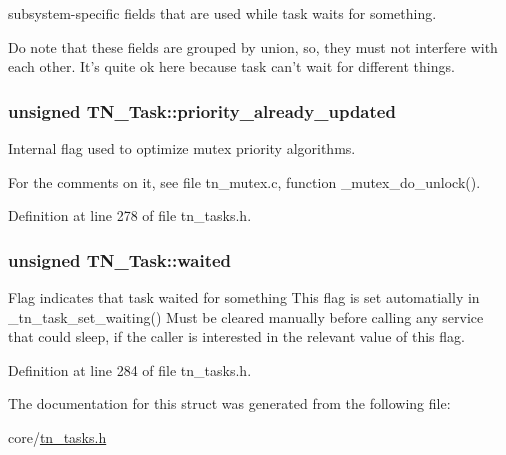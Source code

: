 subsystem-\/specific fields that are used while task waits for something. 

Do note that these fields are grouped by union, so, they must not interfere with each other. It's quite ok here because task can't wait for different things. \hypertarget{structTN__Task_abb4d22974c7317dd610f646b9048656d}{
\subsubsection[{priority\+\_\+already\+\_\+updated}]{\setlength{\rightskip}{0pt plus 5cm}unsigned T\+N\+\_\+\+Task\+::priority\+\_\+already\+\_\+updated}}\label{structTN__Task_abb4d22974c7317dd610f646b9048656d}


Internal flag used to optimize mutex priority algorithms. 

For the comments on it, see file tn\+\_\+mutex.\+c, function {\ttfamily \+\_\+mutex\+\_\+do\+\_\+unlock()}. 

Definition at line 278 of file tn\+\_\+tasks.\+h.

\hypertarget{structTN__Task_a47c3a0a27be1ee526a1599a2ca8bb269}{
\subsubsection[{waited}]{\setlength{\rightskip}{0pt plus 5cm}unsigned T\+N\+\_\+\+Task\+::waited}}\label{structTN__Task_a47c3a0a27be1ee526a1599a2ca8bb269}


Flag indicates that task waited for something This flag is set automatially in {\ttfamily \+\_\+tn\+\_\+task\+\_\+set\+\_\+waiting()} Must be cleared manually before calling any service that could sleep, if the caller is interested in the relevant value of this flag. 



Definition at line 284 of file tn\+\_\+tasks.\+h.



The documentation for this struct was generated from the following file\+:\begin{DoxyCompactItemize}
\item 
core/\hyperlink{tn__tasks_8h}{tn\+\_\+tasks.\+h}\end{DoxyCompactItemize}
